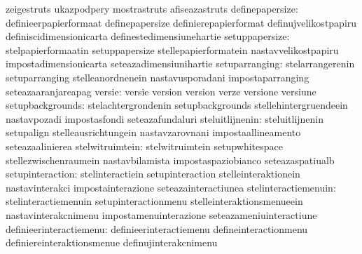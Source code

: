                                   zeigestruts                      ukazpodpery
                                  mostrastruts                     afiseazastruts
                 definepapersize: definieerpapierformaat           definepapersize
                                  definierepapierformat            definujvelikostpapiru
                                  definiscidimensionicarta         definestedimensiunehartie
                  setuppapersize: stelpapierformaatin              setuppapersize
                                  stellepapierformatein            nastavvelikostpapiru
                                  impostadimensionicarta           seteazadimensiunihartie
                  setuparranging: stelarrangerenin                 setuparranging
                                  stelleanordnenein                nastavusporadani
                                  impostaparranging                seteazaaranjareapag
                          versie: versie                           version
                                  version                          verze
                                  versione                         versiune
                setupbackgrounds: stelachtergrondenin              setupbackgrounds
                                  stellehintergruendeein           nastavpozadi
                                  impostasfondi                    seteazafundaluri
                 steluitlijnenin: steluitlijnenin                  setupalign
                                  stelleausrichtungein             nastavzarovnani
                                  impostaallineamento              seteazaalinierea
                 stelwitruimtein: stelwitruimtein                  setupwhitespace
                                  stellezwischenraumein            nastavbilamista
                                  impostaspaziobianco              seteazaspatiualb
                setupinteraction: stelinteractiein                 setupinteraction
                                  stelleinteraktionein             nastavinterakci
                                  impostainterazione               seteazainteractiunea
            stelinteractiemenuin: stelinteractiemenuin             setupinteractionmenu
                                  stelleinteraktionsmenueein       nastavinterakcnimenu
                                  impostamenuinterazione           seteazameniuinteractiune
         definieerinteractiemenu: definieerinteractiemenu          defineinteractionmenu
                                  definiereinteraktionsmenue       definujinterakcnimenu
